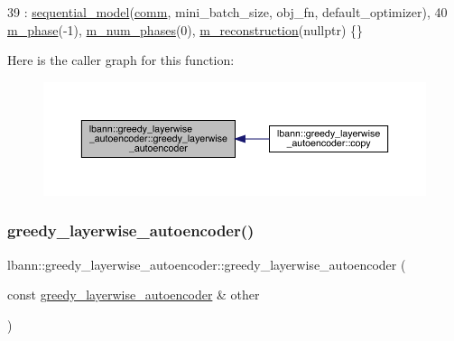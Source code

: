 \begin{DoxyCode}
39   : \hyperlink{classlbann_1_1sequential__model_a269f246d881186f8e8608dc4758cc6a6}{sequential\_model}(\hyperlink{file__io_8cpp_ab048c6f9fcbcfaa57ce68b00263dbebe}{comm}, mini\_batch\_size, obj\_fn, default\_optimizer),
40     \hyperlink{classlbann_1_1greedy__layerwise__autoencoder_a1baf1b5e7fdb5d006f443edbb0bb2973}{m\_phase}(-1), \hyperlink{classlbann_1_1greedy__layerwise__autoencoder_a792010a00136ee1e024b6e5d38c77386}{m\_num\_phases}(0), \hyperlink{classlbann_1_1greedy__layerwise__autoencoder_a8238d2e3e723543c8b6f7f5c61a9ca06}{m\_reconstruction}(\textcolor{keyword}{nullptr}) \{\}
\end{DoxyCode}
Here is the caller graph for this function\+:\nopagebreak
\begin{figure}[H]
\begin{center}
\leavevmode
\includegraphics[width=350pt]{classlbann_1_1greedy__layerwise__autoencoder_a36dff325c3c756623b28cb056f91e058_icgraph}
\end{center}
\end{figure}
\mbox{\label{classlbann_1_1greedy__layerwise__autoencoder_adf8750be08e34891701a24678f703acd}} 
\subsubsection{\texorpdfstring{greedy\+\_\+layerwise\+\_\+autoencoder()}{greedy\_layerwise\_autoencoder()}\hspace{0.1cm}{\footnotesize\ttfamily [2/2]}}
{\footnotesize\ttfamily lbann\+::greedy\+\_\+layerwise\+\_\+autoencoder\+::greedy\+\_\+layerwise\+\_\+autoencoder (\begin{DoxyParamCaption}\item[{const \hyperlink{classlbann_1_1greedy__layerwise__autoencoder}{greedy\+\_\+layerwise\+\_\+autoencoder} \&}]{other }\end{DoxyParamCaption})}

